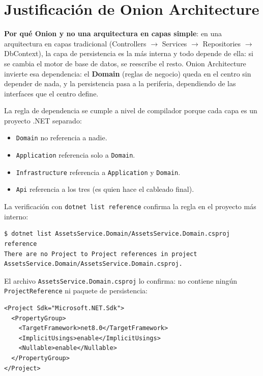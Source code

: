 \documentclass[11pt,a4paper]{article}
\begin{document}
\section{Justificación de Onion Architecture}

\textbf{Por qué Onion y no una arquitectura en capas simple}: en una
arquitectura en capas tradicional (Controllers $\rightarrow$ Services
$\rightarrow$ Repositories $\rightarrow$ DbContext), la capa de persistencia
es la más interna y todo depende de ella: si se cambia el motor de base de
datos, se reescribe el resto. Onion Architecture invierte esa dependencia: el
\textbf{Domain} (reglas de negocio) queda en el centro sin depender de nada,
y la persistencia pasa a la periferia, dependiendo de las interfaces que el
centro define.

La regla de dependencia se cumple a nivel de compilador porque cada capa es
un proyecto .NET separado:

\begin{itemize}
    \item \texttt{Domain} no referencia a nadie.
    \item \texttt{Application} referencia solo a \texttt{Domain}.
    \item \texttt{Infrastructure} referencia a \texttt{Application} y \texttt{Domain}.
    \item \texttt{Api} referencia a los tres (es quien hace el cableado final).
\end{itemize}

La verificación con \texttt{dotnet list reference} confirma la regla en el
proyecto más interno:

\begin{lstlisting}[style=json, caption={Verificación de la regla de dependencia}]
$ dotnet list AssetsService.Domain/AssetsService.Domain.csproj reference
There are no Project to Project references in project
AssetsService.Domain/AssetsService.Domain.csproj.
\end{lstlisting}

El archivo \texttt{AssetsService.Domain.csproj} lo confirma: no contiene
ningún \texttt{ProjectReference} ni paquete de persistencia:

\begin{lstlisting}[style=json, caption={AssetsService.Domain/AssetsService.Domain.csproj}]
<Project Sdk="Microsoft.NET.Sdk">
  <PropertyGroup>
    <TargetFramework>net8.0</TargetFramework>
    <ImplicitUsings>enable</ImplicitUsings>
    <Nullable>enable</Nullable>
  </PropertyGroup>
</Project>
\end{lstlisting}
\end{document}
